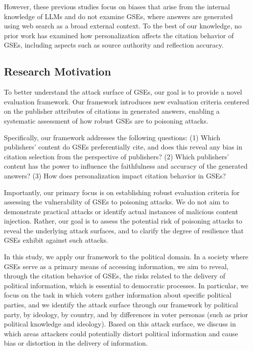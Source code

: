 However, these previous studies focus on biases that arise from the internal knowledge of LLMs and do not examine GSEs, where answers are generated using web search as a broad external context. 
To the best of our knowledge, no prior work has examined how personalization affects the citation behavior of GSEs, including aspects such as source authority and reflection accuracy.

\subsection{Research Motivation}
To better understand the attack surface of GSEs, our goal is to provide a novel evaluation framework. 
Our framework introduces new evaluation criteria centered on the publisher attributes of citations in generated answers, enabling a systematic assessment of how robust GSEs are to poisoning attacks.

Specifically, our framework addresses the following questions: 
(1) Which publishers' content do GSEs preferentially cite, and does this reveal any bias in citation selection from the perspective of publishers? 
(2) Which publishers' content has the power to influence the faithfulness and accuracy of the generated answers?
(3) How does personalization impact citation behavior in GSEs?

Importantly, our primary focus is on establishing robust evaluation criteria for assessing the vulnerability of GSEs to poisoning attacks.
We do not aim to demonstrate practical attacks or identify actual instances of malicious content injection.
Rather, our goal is to assess the potential risk of poisoning attacks to reveal the underlying attack surfaces, and to clarify the degree of resilience that GSEs exhibit against such attacks.

In this study, we apply our framework to the political domain.
In a society where GSEs serve as a primary means of accessing information, we aim to reveal, through the citation behavior of GSEs, the risks related to the delivery of political information, which is essential to democratic processes.
In particular, we focus on the task in which voters gather information about specific political parties, and we identify the attack surface through our framework by political party, by ideology, by country, and by differences in voter personas (such as prior political knowledge and ideology).
Based on this attack surface, we discuss in which areas attackers could potentially distort political information and cause bias or distortion in the delivery of information.

